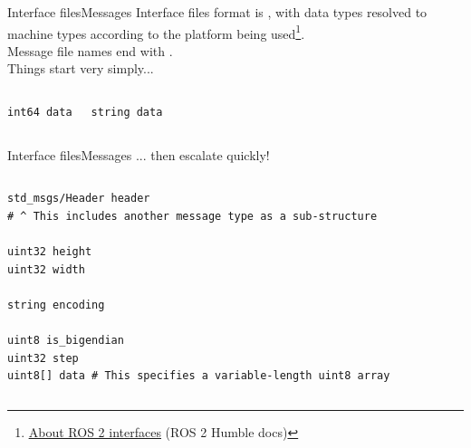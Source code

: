 \begin{frame}[fragile]{Interface files}{Messages}
	Interface files format is , with data types resolved to machine types according to the platform being used\footnote{\href{https://docs.ros.org/en/jazzy/Concepts/About-ROS-Interfaces.html}{\color{blue}\underline{About ROS 2 interfaces}} (ROS 2 Humble docs)}.\\
	Message file names end with .\\
	Things start very simply...

	\begin{columns}
		\begin{lstlisting}[language=ros2msg, caption=Definition of the \texttt{std\_msgs/msg/Int64} message.]
int64 data\end{lstlisting}

		\begin{lstlisting}[language=ros2msg, caption=Definition of the \texttt{std\_msgs/msg/String} message.]
string data\end{lstlisting}
	\end{columns}

\end{frame}
\begin{frame}[fragile]{Interface files}{Messages}
	... then escalate quickly!

	\begin{columns}
		\column{.9\textwidth}
		\begin{lstlisting}[language=ros2msg, caption=Definition of the \texttt{sensor\_msgs/msg/Image} composite message.]
std_msgs/Header header
# ^ This includes another message type as a sub-structure

uint32 height
uint32 width

string encoding

uint8 is_bigendian
uint32 step
uint8[] data # This specifies a variable-length uint8 array\end{lstlisting}
	\end{columns}

\end{frame}
